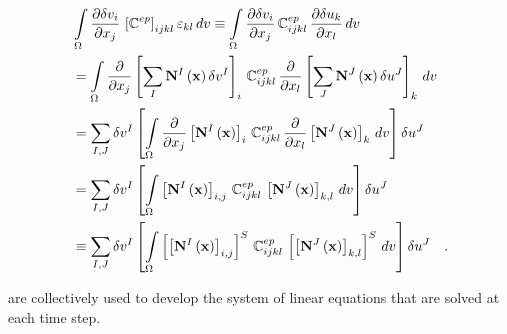 \documentclass[]{scrartcl}
\begin{document}
\begin{align}
&\int\limits_{\Omega} \frac{\partial \delta v_{i}}{\partial x_{j}} \, \left[ \boldsymbol{\mathbb{C}}^{ep} \right]_{ijkl} \varepsilon_{kl} \, dv
  \equiv \int\limits_{\Omega} \frac{\partial \delta v_{i}}{\partial x_{j}} \, \mathbb{C}^{ep}_{ijkl} \, \frac{\partial \delta u_{k}}{\partial x_{l}} \, dv \notag\\
  &= \int\limits_{\Omega} \frac{\partial}{\partial x_{j}} \left[ \sum\limits_{I} \mathbf{N}^{I} \left( \mathbf{x} \right) \delta v^{I} \right]_{i} \, \mathbb{C}^{ep}_{ijkl} \, \frac{\partial}{\partial x_{l}} \left[ \sum\limits_{J} \mathbf{N}^{J} \left( \mathbf{x} \right) \delta u^{J} \right]_{k} \, dv \notag\\
  &= \sum\limits_{I,J} \delta v^{I} \left[ \int\limits_{\Omega} \frac{\partial}{\partial x_{j}} \left[  \mathbf{N}^{I} \left( \mathbf{x} \right)  \right]_{i} \, \mathbb{C}^{ep}_{ijkl} \, \frac{\partial}{\partial x_{l}} \left[ \mathbf{N}^{J} \left( \mathbf{x} \right)  \right]_{k} \, dv \right] \delta u^{J} \notag\\
  &= \sum\limits_{I,J} \delta v^{I} \left[ \int\limits_{\Omega} \left[  \mathbf{N}^{I} \left( \mathbf{x} \right)  \right]_{i,j} \, \mathbb{C}^{ep}_{ijkl} \, \left[ \mathbf{N}^{J} \left( \mathbf{x} \right)  \right]_{k,l} \, dv \right] \delta u^{J} \notag\\
  &\equiv \sum\limits_{I,J} \delta v^{I} \left[ \int\limits_{\Omega} \left[\left[  \mathbf{N}^{I} \left( \mathbf{x} \right)  \right]_{i,j} \right]^{S} \, \mathbb{C}^{ep}_{ijkl} \, \left[\left[ \mathbf{N}^{J} \left( \mathbf{x} \right)  \right]_{k,l}\right]^{S} \, dv \right] \delta u^{J}
\label{equ: Discretisation: Material tangent}
\quad .
\end{align}

 are collectively used to develop the system of linear equations that are solved at each time step.


 
\end{document}

